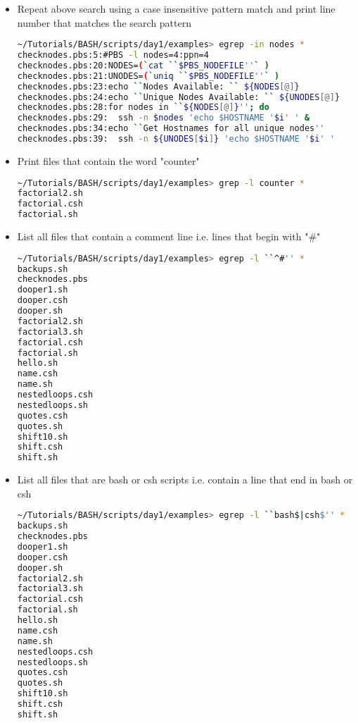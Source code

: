 \documentclass[slidestop,mathserif,compress,xcolor=svgnames]{beamer}
\begin{document}
\begin{frame}
\begin{itemize}
    \item Repeat above search using a case insensitive pattern match and print line number that matches the search pattern
      \begin{lstlisting}[language=bash]
~/Tutorials/BASH/scripts/day1/examples> egrep -in nodes *
checknodes.pbs:5:#PBS -l nodes=4:ppn=4
checknodes.pbs:20:NODES=(`cat ``$PBS_NODEFILE''` )
checknodes.pbs:21:UNODES=(`uniq ``$PBS_NODEFILE''` )
checknodes.pbs:23:echo ``Nodes Available: `` ${NODES[@]}
checknodes.pbs:24:echo ``Unique Nodes Available: `` ${UNODES[@]}
checknodes.pbs:28:for nodes in ``${NODES[@]}''; do
checknodes.pbs:29:  ssh -n $nodes 'echo $HOSTNAME '$i' ' &
checknodes.pbs:34:echo ``Get Hostnames for all unique nodes''
checknodes.pbs:39:  ssh -n ${UNODES[$i]} 'echo $HOSTNAME '$i' '
      \end{lstlisting}
    \item Print files that contain the word "counter"
      \begin{lstlisting}[language=bash]
~/Tutorials/BASH/scripts/day1/examples> grep -l counter *
factorial2.sh
factorial.csh
factorial.sh
      \end{lstlisting}
    \item List all files that contain a comment line i.e. lines that begin with "\#"
      \begin{lstlisting}[language=bash]
~/Tutorials/BASH/scripts/day1/examples> egrep -l ``^#'' *
backups.sh
checknodes.pbs
dooper1.sh
dooper.csh
dooper.sh
factorial2.sh
factorial3.sh
factorial.csh
factorial.sh
hello.sh
name.csh
name.sh
nestedloops.csh
nestedloops.sh
quotes.csh
quotes.sh
shift10.sh
shift.csh
shift.sh
      \end{lstlisting}
    \item List all files that are bash or csh scripts i.e. contain a line that end in bash or csh
      \begin{lstlisting}[language=bash]
~/Tutorials/BASH/scripts/day1/examples> egrep -l ``bash$|csh$'' *
backups.sh
checknodes.pbs
dooper1.sh
dooper.csh
dooper.sh
factorial2.sh
factorial3.sh
factorial.csh
factorial.sh
hello.sh
name.csh
name.sh
nestedloops.csh
nestedloops.sh
quotes.csh
quotes.sh
shift10.sh
shift.csh
shift.sh
      \end{lstlisting}
  \end{itemize}
\end{frame}
\end{document}
